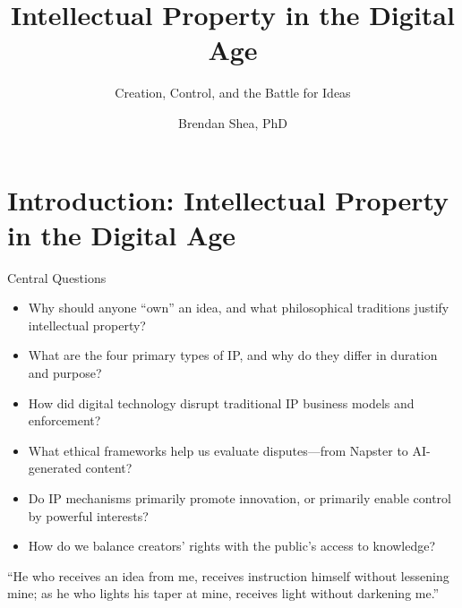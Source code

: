 \documentclass[aspectratio=169]{beamer}
\title[Intellectual Property]{Intellectual Property in the Digital Age}
\subtitle{Creation, Control, and the Battle for Ideas}
\author{Brendan Shea, PhD}
\institute{Rochester Community and Technical College\\Computing and AI Ethics}
\date{}
\begin{document}
\section{Introduction: Intellectual Property in the Digital Age}


\begin{frame}
\titlepage
\end{frame}

\begin{frame}{Central Questions}
\begin{itemize}
    \item Why should anyone ``own'' an idea, and what philosophical traditions justify intellectual property?
    \item What are the four primary types of IP, and why do they differ in duration and purpose?
    \item How did digital technology disrupt traditional IP business models and enforcement?
    \item What ethical frameworks help us evaluate disputes---from Napster to AI-generated content?
    \item Do IP mechanisms primarily promote innovation, or primarily enable control by powerful interests?
    \item How do we balance creators' rights with the public's access to knowledge?
\end{itemize}

\vspace{0.2cm}
\begin{quotebox}
``He who receives an idea from me, receives instruction himself without lessening mine; as he who lights his taper at mine, receives light without darkening me.''
\end{quotebox}
\end{frame}
\end{document}

